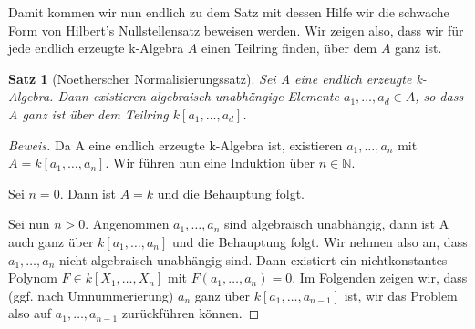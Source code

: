 \documentclass{article}
\newtheorem{satz}{Satz}
\begin{document}
	Damit kommen wir nun endlich zu dem Satz mit dessen Hilfe wir die schwache 
	Form von Hilbert's Nullstellensatz beweisen werden. Wir zeigen also, dass 
	wir für jede endlich erzeugte k-Algebra \(A\) einen Teilring finden, über 
	dem \(A\) ganz ist.
	
	\begin{satz}[Noetherscher Normalisierungssatz] \label{2.1.4}
	Sei A eine endlich erzeugte k-Algebra. Dann existieren algebraisch
	unabhängige Elemente \(a_1, \ldots, a_d \in A\), so dass A ganz ist über
	dem Teilring \(k[a_1, \ldots, a_d]\).
	\end{satz}

	\begin{proof}[Beweis]
	Da A eine endlich erzeugte k-Algebra ist, existieren \(a_1,\ldots,a_n\) mit
	\(A = k[a_1,\ldots,a_n]\). Wir führen nun eine Induktion
	über \(n \in \mathbb{N}\).

	Sei \(n=0\). Dann ist \(A=k\) und die Behauptung folgt.

	Sei nun \(n > 0\). Angenommen \(a_1,\ldots,a_n\) sind algebraisch unabhängig,
	dann ist A auch ganz über \(k[a_1,\ldots,a_n]\) und die Behauptung folgt.
	Wir nehmen also an, dass \(a_1,\ldots,a_n\) nicht algebraisch unabhängig sind.
	Dann existiert ein nichtkonstantes Polynom \(F \in  k[X_1,\ldots,X_n]\)	mit
	\(F(a_1,\ldots,a_n) = 0\).
	Im Folgenden zeigen wir, dass (ggf. nach Umnummerierung) \(a_n\) ganz über
	\(k[a_1,\ldots,a_{n-1}]\) ist, wir das Problem also auf \(a_1,\ldots,a_{n-1}\)
	zurückführen können.


\end{proof}
\end{document}
